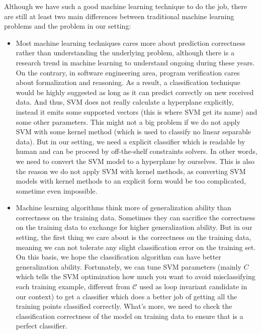 Although we have such a good machine learning technique to do the job,
there are still at least two main differences between traditional machine learning problems and the problem in our setting:
\begin{itemize}
\item Most machine learning techniques cares more about prediction correctness rather than understanding the underlying problem,
although there is a research trend in machine learning to understand ongoing during these years.
On the contrary, in software engineering area, program verification cares about formalization and reasoning.
As a result, a classification technique would be highly suggested as long as it can predict correctly on new received data.
And thus, SVM does not really calculate a hyperplane explicitly, 
instead it emits some supported vectors (this is where SVM get its name) and some other parameters.
This might not a big problem if we do not apply SVM with some kernel method (which is used to classify no linear separable data).
But in our setting, we need a explicit classifier which is readable by human and can be proceed by off-the-shelf constraints solvers.
In other words, we need to convert the SVM model to a hyperplane by ourselves.
This is also the reason we do not apply SVM with kernel methods,
as converting SVM models with kernel methods to an explicit form would be too complicated, sometime even impossible.
\item Machine learning algorithms think more of generalization ability than correctness on the training data.
Sometimes they can sacrifice the correctness on the training data to exchange for higher generalization ability.
But in our setting, the first thing we care about is the correctness on the training data,
meaning we can not tolerate any slight classification error on the training set.
On this basis, we hope the classification algorithm can have better generalization ability.
Fortunately, we can tune SVM parameters (mainly $C$ which tells the SVM optimization how much you want to avoid misclassifying each training example,
different from $\mathcal{C}$ used as loop invariant candidate in our context) 
to get a classifier which does a better job of getting all the training points classified correctly.
What's more, we need to check the classification correctness of the model on training data to ensure that is a perfect classifier. 

\end{itemize} 

